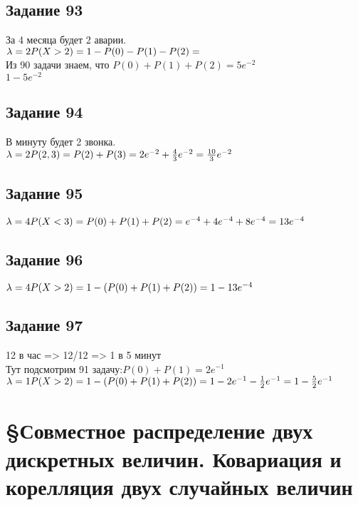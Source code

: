\documentclass[12pt]{article}
\begin{document}
\subsection{Задание 93}
За 4 месяца будет 2 аварии.\\
$
\lambda=2\\
P(X>2)=1-P(0)-P(1)-P(2)=
$\\
Из 90 задачи знаем, что $P(0)+P(1)+P(2)=5e^{-2}$\\
$
1-5e^{-2}
$
\newpage
\subsection{Задание 94}
В минуту будет 2 звонка.\\
$
\lambda=2\\
P(2,3)=P(2)+P(3)=2e^{-2}+\frac{4}{3}e^{-2}=\frac{10}{3}e^{-2}
$
\newpage
\subsection{Задание 95}
$
\lambda=4\\
P(X<3)=P(0)+P(1)+P(2)=e^{-4}+4e^{-4}+8e^{-4}=13e^{-4}
$
\newpage
\subsection{Задание 96}
$
\lambda=4\\
P(X>2)=1-(P(0)+P(1)+P(2))=1-13e^{-4}
$
\newpage
\subsection{Задание 97}
12 в час => 12/12 => 1 в 5 минут\\
Тут подсмотрим 91 задачу:$P(0)+P(1)=2e^{-1}$\\
$
\lambda=1\\
P(X>2)=1-(P(0)+P(1)+P(2))=1-2e^{-1}-\frac{1}{2}e^{-1}=1-\frac{5}{2}e^{-1}
$
\newpage
\section{\S Совместное распределение двух дискретных величин. Ковариация и корелляция двух случайных величин}
\end{document}
